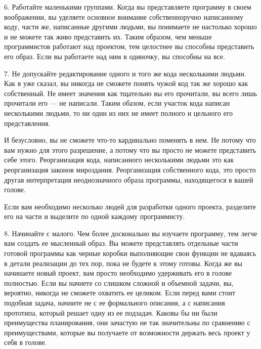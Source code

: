 \documentclass[ebook,12pt,oneside,openany]{memoir}
\begin{document}
6. Работайте маленькими группами. Когда вы представляете программу в
своем воображении, вы уделяете основное внимание собственноручно
написанному коду, части же, написанные другими людьми, вы понимаете не
настолько хорошо и не можете так живо представить их. Таким образом,
чем меньше программистов работают над проектом, тем целостнее вы
способны представить его образ. Если вы работаете над ним в одиночку,
вы способны на все.

7. Не допускайте редактирование одного и того же кода несколькими
людьми. Как я уже сказал, вы никогда не сможете понять чужой код так
же хорошо как собственный. Не имеет значения как тщательно вы его
прочитали, вы всего лишь прочитали его — не написали. Таким обазом,
если участок кода написан несколькими людьми, то ни один из них не
имеет полного и цельного его представления.

И безусловно, вы не сможете что-то кардинально поменять в нем. Не
потому что вам нужно для этого разрешение, а потому что вы просто не
можете представить себе этого. Реорганизация кода, написанного
несколькими людьми это как реорганизация законов мироздания.
Реорганизация собственного кода, это просто другая интерпретация
неоднозначного образа программы, находящегося в вашей голове.

Если вам необходимо несколько людей для разработки одного проекта,
разделите его на части и выделите по одной каждому программисту.

8. Начинайте с малого. Чем более досконально вы изучаете программу,
тем легче вам создать ее мысленный образ. Вы можете представлять
отдельные части готовой программы как черные коробки выполняющие свои
функции не вдаваясь в детали реализации до тех пор, пока не будете к
этому готовы. Когда же вы начинаете новый проект, вам просто
необходимо удерживать его в голове полностью. Если вы начнете со
слишком сложной и объемной задачи, вы, вероятно, никогда не сможете
охватить ее целиком. Если перед вами стоит подобная задача, начните не
с ее формального описания, а с написания прототипа, который решает
одну из ее подзадач. Каковы бы ни были преимущества планирования, они
зачастую не так значительны по сравнению с преимуществами, которые вы
получаете от возможности держать весь проект у себя в голове.
\end{document}
